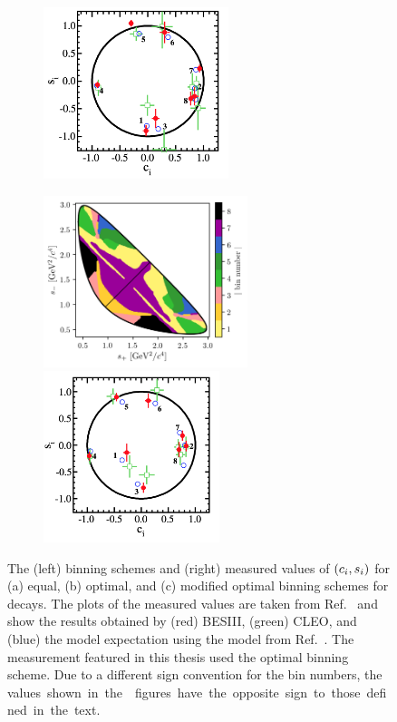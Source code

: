 \begin{figure}[p]
\begin{subfigure}{\columnwidth}
        \includegraphics[height=5cm]{figures/theory/cisi_optimal.png}
        \caption{}
        \label{fig:kspipi_bins_opt}
    \end{subfigure}
    \begin{subfigure}{\columnwidth}
        \centering
        \includegraphics[height=5cm]{figures/theory/binnings/KsPiPi_mod_optimal.png}
        \includegraphics[height=5cm]{figures/theory/cisi_modified_optimal.png}
        \caption{}
        \label{fig:kspipi_bins_modopt}
    \end{subfigure}
    \caption{The (left) binning schemes and (right) measured values of $(c_i,s_i)$ for (a) equal, (b) optimal, and (c) modified optimal binning schemes for \DtoKspipi decays. The plots of the measured values are taken from Ref.~\cite{BESCISI} and show the results obtained by (red) BESIII, (green) CLEO, and (blue) the model expectation using the model from Ref.~\cite{Belle2018}.
    The measurement featured in this thesis used the optimal binning scheme. Due to a different sign convention for the bin numbers, the \si values shown in the \besiii figures have the opposite sign to those defined in the text.}
    \label{fig:kspipi_bins}
\end{figure}

